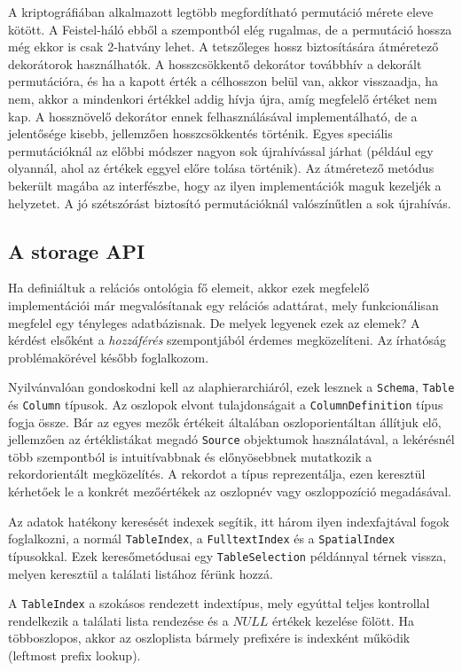 \documentclass[
    parspace,
    noindent,
    nohyp,
]{elteiktdk}[2023/04/10]
\begin{document}
A kriptográfiában alkalmazott legtöbb megfordítható permutáció mérete eleve kötött.
A Feistel-háló ebből a szempontból elég rugalmas,
de a permutáció hossza még ekkor is csak 2-hatvány lehet.
A tetszőleges hossz biztosítására átméretező dekorátorok használhatók.
A hosszcsökkentő dekorátor továbbhív a dekorált permutációra,
és ha a kapott érték a célhosszon belül van, akkor visszaadja, ha nem,
akkor a mindenkori értékkel addig hívja újra,
amíg megfelelő értéket nem kap.
A hossznövelő dekorátor ennek felhasználásával implementálható,
de a jelentősége kisebb, jellemzően hosszcsökkentés történik.
Egyes speciális permutációknál az előbbi módszer nagyon sok újrahívással járhat
(például egy olyannál, ahol az értékek eggyel előre tolása történik).
Az átméretező metódus bekerült magába az interfészbe,
hogy az ilyen implementációk maguk kezeljék a helyzetet.
A jó szétszórást biztosító permutációknál valószínűtlen a sok újrahívás.

\subsection{A storage API}

Ha definiáltuk a relációs ontológia fő elemeit,
akkor ezek megfelelő implementációi már megvalósítanak egy relációs adattárat,
mely funkcionálisan megfelel egy tényleges adatbázisnak.
De melyek legyenek ezek az elemek?
A kérdést elsőként a \textit{hozzáférés} szempontjából érdemes megközelíteni.
Az írhatóság problémakörével később foglalkozom.

Nyilvánvalóan gondoskodni kell az alaphierarchiáról,
ezek lesznek a \texttt{Schema}, \texttt{Table} és \texttt{Column} típusok.
Az oszlopok elvont tulajdonságait a \texttt{ColumnDefinition} típus fogja össze.
Bár az egyes mezők értékeit általában oszloporientáltan állítjuk elő,
jellemzően az értéklistákat megadó \texttt{Source} objektumok használatával,
a lekérésnél több szempontból is intuitívabbnak és előnyösebbnek mutatkozik
a rekordorientált megközelítés.
A rekordot a  típus reprezentálja,
ezen keresztül kérhetőek le a konkrét mezőértékek
az oszlopnév vagy oszloppozíció megadásával.

Az adatok hatékony keresését indexek segítik, itt három ilyen indexfajtával fogok foglalkozni,
a normál \texttt{TableIndex}, a \texttt{FulltextIndex} és a \texttt{SpatialIndex} típusokkal.
Ezek keresőmetódusai egy \texttt{TableSelection} példánnyal térnek vissza,
melyen keresztül a találati listához férünk hozzá.

A \texttt{TableIndex} a szokásos rendezett indextípus,
mely egyúttal teljes kontrollal rendelkezik a találati lista rendezése
és a $NULL$ értékek kezelése fölött.
Ha többoszlopos, akkor az oszloplista bármely prefixére is indexként működik (leftmost prefix lookup).
\end{document}
